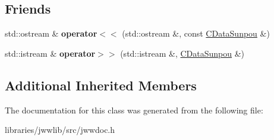 \subsection*{Friends}
\begin{DoxyCompactItemize}
\item 
\hypertarget{classCDataSunpou_af6b09051eb611f0f8ea2a86ee14fecf9}{std\-::ostream \& {\bfseries operator$<$$<$} (std\-::ostream \&, const \hyperlink{classCDataSunpou}{C\-Data\-Sunpou} \&)}\label{classCDataSunpou_af6b09051eb611f0f8ea2a86ee14fecf9}

\item 
\hypertarget{classCDataSunpou_a91f91e35ca49d4c6d1a122d3c1cbc799}{std\-::istream \& {\bfseries operator$>$$>$} (std\-::istream \&, \hyperlink{classCDataSunpou}{C\-Data\-Sunpou} \&)}\label{classCDataSunpou_a91f91e35ca49d4c6d1a122d3c1cbc799}

\end{DoxyCompactItemize}
\subsection*{Additional Inherited Members}


The documentation for this class was generated from the following file\-:\begin{DoxyCompactItemize}
\item 
libraries/jwwlib/src/jwwdoc.\-h\end{DoxyCompactItemize}
